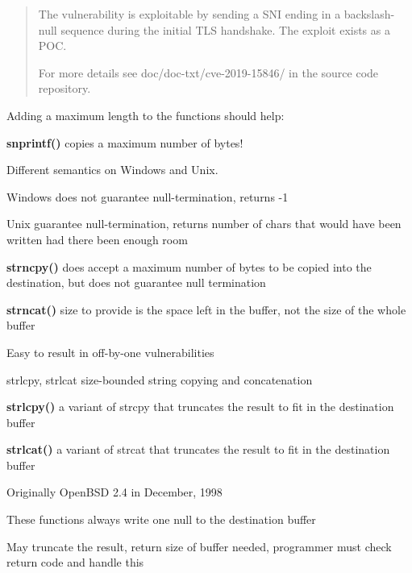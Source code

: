 \documentclass[Screen16to9,17pt]{foils}
\begin{document}
\begin{quote}
The vulnerability is exploitable by sending a SNI ending in a
backslash-null sequence during the initial TLS handshake. The exploit
exists as a POC.

For more details see doc/doc-txt/cve-2019-15846/ in the source code
repository.
\end{quote}


\begin{list2}
\item Adding a maximum length to the functions should help:
\item {\bf snprintf()} copies a maximum number of bytes!
\item Different semantics on Windows and Unix.
\item Windows does not guarantee null-termination, returns -1
\item Unix guarantee null-termination, returns number of chars that would have been written had there been enough room
\item {\bf strncpy()} does accept a maximum number of bytes to be copied into the destination, but does not guarantee null termination
\item {\bf strncat()} size to provide is the space left in the buffer, not the size of the whole buffer
\item Easy to result in off-by-one vulnerabilities
\end{list2}


\begin{list2}
\item strlcpy, strlcat  size-bounded string copying and concatenation
\item {\bf strlcpy()} a variant of strcpy that truncates the result to fit in the destination buffer
\item {\bf strlcat()} a variant of strcat that truncates the result to fit in the destination buffer
\item Originally OpenBSD 2.4 in December, 1998
\item These functions always write one null to the destination buffer
\item May truncate the result, return size of buffer needed, programmer must check return code and handle this
\end{list2}

\end{document}
